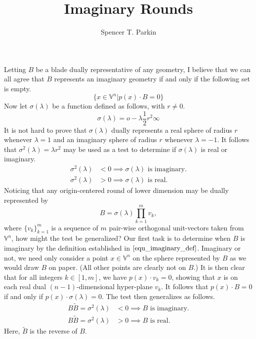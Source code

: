 \documentclass[12pt]{article}
\title{Imaginary Rounds}
\author{Spencer T. Parkin}
\newcommand{\V}{\mathbb{V}}
\newcommand{\nvao}{o}
\newcommand{\nvai}{\infty}
\begin{document}
\maketitle

Letting $B$ be a blade dually representative of any geometry, I believe that we can all agree that
$B$ represents an imaginary geometry if and only if the following set is empty.
\begin{equation}\label{equ_imaginary_def}
\{x\in\V^n|p(x)\cdot B=0\}
\end{equation}
Now let $\sigma(\lambda)$ be a function defined as follows, with $r\neq 0$.
\begin{equation*}
\sigma(\lambda) = \nvao - \lambda\frac{1}{2}r^2\nvai
\end{equation*}
It is not hard to prove that $\sigma(\lambda)$ dually represents a real sphere of radius $r$ whenever
$\lambda=1$ and an imaginary sphere of radius $r$ whenever $\lambda=-1$.
It follows that $\sigma^2(\lambda)=\lambda r^2$ may be used as a test to determine
if $\sigma(\lambda)$ is real or imaginary.
\begin{align*}
\sigma^2(\lambda) &< 0\implies\mbox{$\sigma(\lambda)$ is imaginary.} \\
\sigma^2(\lambda) &> 0\implies\mbox{$\sigma(\lambda)$ is real.}
\end{align*}
Noticing that any origin-centered round of lower dimension may be dually represented by
\begin{equation*}
B=\sigma(\lambda)\prod_{k=1}^m v_k,
\end{equation*}
where $\{v_k\}_{k=1}^m$ is a sequence of $m$ pair-wise orthogonal unit-vectors taken from $\V^n$,
how might the test be generalized?  Our first task is to determine when $B$ is imaginary by the definition
established in $\eqref{equ_imaginary_def}$.  Imaginary or not, we need only consider a point $x\in\V^n$ on the
sphere represented by $B$ as we would draw $B$ on paper.  (All other points are clearly not on $B$.)
It is then clear that for all integers $k\in[1,m]$,
we have $p(x)\cdot v_k=0$, showing that $x$ is on each real dual $(n-1)$-dimensional hyper-plane $v_k$.
It follows that $p(x)\cdot B=0$ if and only if $p(x)\cdot\sigma(\lambda)=0$.  The test then generalizes as
follows.
\begin{align*}
B\tilde{B} = \sigma^2(\lambda) &< 0\implies\mbox{$B$ is imaginary.} \\
B\tilde{B} = \sigma^2(\lambda) &> 0\implies\mbox{$B$ is real.}
\end{align*}
Here, $\tilde{B}$ is the reverse of $B$.
\end{document}
